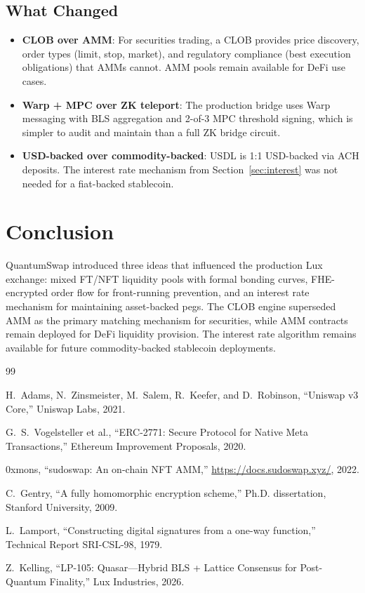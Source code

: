 \documentclass[11pt,a4paper]{article}
\begin{document}
\subsection{What Changed}

\begin{itemize}[nosep]
  \item \textbf{CLOB over AMM}: For securities trading, a CLOB provides
        price discovery, order types (limit, stop, market), and
        regulatory compliance (best execution obligations) that AMMs
        cannot. AMM pools remain available for DeFi use cases.
  \item \textbf{Warp + MPC over ZK teleport}: The production bridge
        uses Warp messaging with BLS aggregation and 2-of-3 MPC
        threshold signing, which is simpler to audit and maintain than
        a full ZK bridge circuit.
  \item \textbf{USD-backed over commodity-backed}: USDL is 1:1
        USD-backed via ACH deposits. The interest rate mechanism
        from Section~\ref{sec:interest} was not needed for a
        fiat-backed stablecoin.
\end{itemize}

\section{Conclusion}

QuantumSwap introduced three ideas that influenced the production Lux
exchange: mixed FT/NFT liquidity pools with formal bonding curves,
FHE-encrypted order flow for front-running prevention, and an interest
rate mechanism for maintaining asset-backed pegs. The CLOB engine
superseded AMM as the primary matching mechanism for securities, while
AMM contracts remain deployed for DeFi liquidity provision. The
interest rate algorithm remains available for future commodity-backed
stablecoin deployments.


\begin{thebibliography}{99}

H.~Adams, N.~Zinsmeister, M.~Salem, R.~Keefer, and D.~Robinson,
``Uniswap v3 Core,'' Uniswap Labs, 2021.

G.~S.~Vogelsteller et al., ``ERC-2771: Secure Protocol for Native
Meta Transactions,'' Ethereum Improvement Proposals, 2020.

0xmons, ``sudoswap: An on-chain NFT AMM,''
\url{https://docs.sudoswap.xyz/}, 2022.

C.~Gentry, ``A fully homomorphic encryption scheme,'' Ph.D.
dissertation, Stanford University, 2009.

L.~Lamport, ``Constructing digital signatures from a one-way
function,'' Technical Report SRI-CSL-98, 1979.

Z.~Kelling, ``LP-105: Quasar---Hybrid BLS + Lattice Consensus for
Post-Quantum Finality,'' Lux Industries, 2026.

\end{thebibliography}
\end{document}
